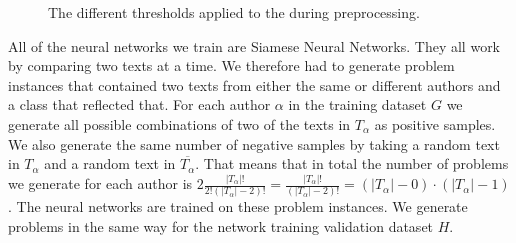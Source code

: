 \begin{figure}[htb]

    \caption{The different thresholds applied to the during preprocessing.}
    \label{fig:character_frequencies}
\end{figure}

All of the neural networks we train are Siamese Neural Networks. They all
work by comparing two texts at a time. We therefore had to generate problem
instances that contained two texts from either the same or different authors and
a class that reflected that. For each author $\alpha$ in the training dataset
$G$ we generate all possible combinations of two of the texts in $T_\alpha$
as positive samples. We also generate the same number of negative samples by
taking a random text in $T_\alpha$ and a random text in $\overline{T_\alpha}$.
That means that in total the number of problems we generate for each
author is $2\frac{\left|T_\alpha\right|!}{2!(\left|T_\alpha\right|-2)!}
= \frac{\left|T_\alpha\right|!}{(\left|T_\alpha\right|-2)!} =
(\left|T_\alpha\right| - 0) \cdot (\left|T_\alpha\right| - 1) $. The neural
networks are trained on these problem instances. We generate problems in the
same way for the network training validation dataset $H$.

